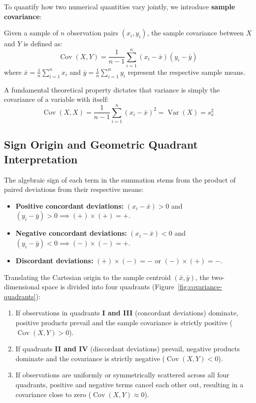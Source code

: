 To quantify how two numerical quantities vary jointly, we introduce \textbf{sample covariance}:

\begin{definition}
Given a sample of $n$ observation pairs $(x_i, y_i)$, the sample covariance between $X$ and $Y$ is defined as:
\begin{equation}
\operatorname{Cov}(X, Y) = \frac{1}{n-1} \sum_{i=1}^n (x_i - \bar{x})(y_i - \bar{y})
\end{equation}
where $\bar{x} = \frac{1}{n}\sum_{i=1}^n x_i$ and $\bar{y} = \frac{1}{n}\sum_{i=1}^n y_i$ represent the respective sample means.
\end{definition}

A fundamental theoretical property dictates that variance is simply the covariance of a variable with itself:
\begin{equation}
\operatorname{Cov}(X, X) = \frac{1}{n-1} \sum_{i=1}^n (x_i - \bar{x})^2 = \operatorname{Var}(X) = s_x^2
\end{equation}

\subsection{Sign Origin and Geometric Quadrant Interpretation}
The algebraic sign of each term in the summation stems from the product of paired deviations from their respective means:
\begin{itemize}
    \item \textbf{Positive concordant deviations:} $(x_i - \bar{x}) > 0$ and $(y_i - \bar{y}) > 0 \implies (+)\times(+) = \mathbf{+}$.
    \item \textbf{Negative concordant deviations:} $(x_i - \bar{x}) < 0$ and $(y_i - \bar{y}) < 0 \implies (-)\times(-) = \mathbf{+}$.
    \item \textbf{Discordant deviations:} $(+)\times(-) = \mathbf{-}$ or $(-)\times(+) = \mathbf{-}$.
\end{itemize}

Translating the Cartesian origin to the sample centroid $(\bar{x}, \bar{y})$, the two-dimensional space is divided into four quadrants (Figure~\ref{fig:covariance-quadrants}):
\begin{enumerate}
    \item If observations in quadrants \textbf{I and III} (concordant deviations) dominate, positive products prevail and the sample covariance is strictly positive ($\operatorname{Cov}(X, Y) > 0$).
    \item If quadrants \textbf{II and IV} (discordant deviations) prevail, negative products dominate and the covariance is strictly negative ($\operatorname{Cov}(X, Y) < 0$).
    \item If observations are uniformly or symmetrically scattered across all four quadrants, positive and negative terms cancel each other out, resulting in a covariance close to zero ($\operatorname{Cov}(X, Y) \approx 0$).
\end{enumerate}

